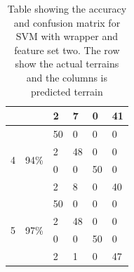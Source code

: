 \documentclass[USenglish]{ifimaster}  %
\begin{document}
\begin{table}[h]
\begin{tabular}{@{}llllll@{}}
			\multicolumn{1}{l|}{} & \multicolumn{1}{l|}{} & \multicolumn{1}{l|}{2} & \multicolumn{1}{l|}{7} & \multicolumn{1}{l|}{0} & 41 \\ \midrule
			\multicolumn{1}{l|}{\multirow{4}{*}{4}} & \multicolumn{1}{l|}{\multirow{4}{*}{94\%}} & \multicolumn{1}{l|}{50} & \multicolumn{1}{l|}{0} & \multicolumn{1}{l|}{0} & 0 \\ \cmidrule(l){3-6} 
			\multicolumn{1}{l|}{} & \multicolumn{1}{l|}{} & \multicolumn{1}{l|}{2} & \multicolumn{1}{l|}{48} & \multicolumn{1}{l|}{0} & 0 \\ \cmidrule(l){3-6} 
			\multicolumn{1}{l|}{} & \multicolumn{1}{l|}{} & \multicolumn{1}{l|}{0} & \multicolumn{1}{l|}{0} & \multicolumn{1}{l|}{50} & 0 \\ \cmidrule(l){3-6} 
			\multicolumn{1}{l|}{} & \multicolumn{1}{l|}{} & \multicolumn{1}{l|}{2} & \multicolumn{1}{l|}{8} & \multicolumn{1}{l|}{0} & 40 \\ \midrule
			\multicolumn{1}{l|}{\multirow{4}{*}{5}} & \multicolumn{1}{l|}{\multirow{4}{*}{97\%}} & \multicolumn{1}{l|}{50} & \multicolumn{1}{l|}{0} & \multicolumn{1}{l|}{0} & 0 \\ \cmidrule(l){3-6} 
			\multicolumn{1}{l|}{} & \multicolumn{1}{l|}{} & \multicolumn{1}{l|}{2} & \multicolumn{1}{l|}{48} & \multicolumn{1}{l|}{0} & 0 \\ \cmidrule(l){3-6} 
			\multicolumn{1}{l|}{} & \multicolumn{1}{l|}{} & \multicolumn{1}{l|}{0} & \multicolumn{1}{l|}{0} & \multicolumn{1}{l|}{50} & 0 \\ \cmidrule(l){3-6} 
			\multicolumn{1}{l|}{} & \multicolumn{1}{l|}{} & \multicolumn{1}{l|}{2} & \multicolumn{1}{l|}{1} & \multicolumn{1}{l|}{0} & 47 \\ \bottomrule
		\end{tabular}
		\caption{Table showing the accuracy and confusion matrix for SVM with wrapper and feature set two. The row show the actual terrains and the columns is predicted terrain}
		\label{svmexp}
	\end{table}
	\FloatBarrier
\end{document}
